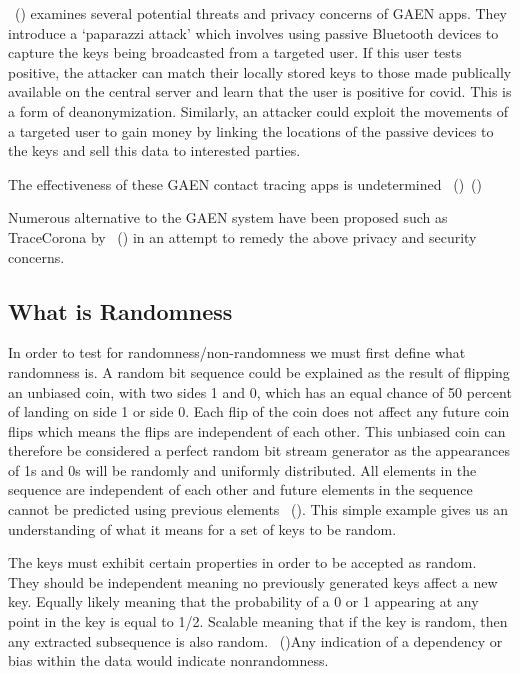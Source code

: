 ~(\cite{9928557}) examines several potential threats and privacy concerns of GAEN apps. They introduce a ‘paparazzi attack’ which involves using passive Bluetooth devices to capture the keys being broadcasted from a targeted user. If this user tests positive, the attacker can match their locally stored keys to those made publically available on the central server and learn that the user is positive for covid. This is a form of deanonymization. Similarly, an attacker could exploit the movements of a targeted user to gain money by linking the locations of the passive devices to the keys and sell this data to interested parties. \newline

The effectiveness of these GAEN contact tracing apps is undetermined ~(\cite{9488728})~(\cite{9931613}) 

Numerous alternative to the GAEN system have been proposed such as TraceCorona by ~(\cite{9931613}) in an attempt to remedy the above privacy and security concerns.


\subsection{What is Randomness}

In order to test for randomness/non-randomness we must first define what randomness is. A random bit sequence could be explained as the result of flipping an unbiased coin, with two sides 1 and 0, which has an equal chance of 50 percent of landing on side 1 or side 0. Each flip of the coin does not affect any future coin flips which means the flips are independent of each other. This unbiased coin can therefore be considered a perfect random bit stream generator as the appearances of 1s and 0s will be randomly and uniformly distributed. All elements in the sequence are independent of each other and future elements in the sequence cannot be predicted using previous elements ~(\cite{Nistdoc2}). This simple example gives us an understanding of what it means for a set of keys to be random. \newline

The keys must exhibit certain properties in order to be accepted as random. They should be independent meaning no previously generated keys affect a new key.  Equally likely meaning that  the probability of a 0 or 1 appearing at any point in the key is equal to 1/2. Scalable meaning that if the key is random, then any extracted subsequence is also random. ~(\cite{10.1145/3390525.3390540})Any indication of a dependency or bias within the data would indicate nonrandomness. \newline

